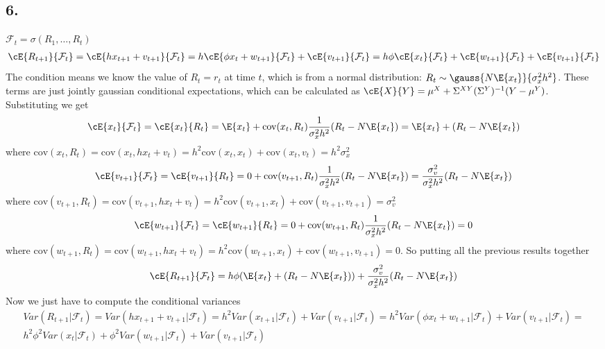 \subsection*{6.} 
$\mathcal{F}_t = \sigma(R_1,\ldots,R_t )$
\begin{gather*}
\cE{R_{t+1}}{\mathcal{F}_t} = \cE{hx_{t+1}+v_{t+1}}{\mathcal{F}_t} = h \cE{\phi x_t + w_{t+1}}{\mathcal{F}_t} + \cE{v_{t+1}}{\mathcal{F}_t} =
h \phi \cE{x_t}{\mathcal{F}_t} + \cE{w_{t+1}}{\mathcal{F}_t} + \cE{v_{t+1}}{\mathcal{F}_t} 
\end{gather*}
The condition means we know the value of $R_t=r_t$ at time $t$, which is from a normal distribution: $R_t \sim \gauss{N\E{x_t}}{\sigma^2_xh^2}$. These terms are just jointly gaussian conditional expectations, which can be calculated as $\cE{X}{Y}= \mu^{X}+\Sigma^{XY}(\Sigma^{Y})^{-1}(Y-\mu^{Y})$. Substituting we get
\begin{gather*}
    \cE{x_t}{\mathcal{F}_t}=\cE{x_t}{R_t}=\E{x_t}+\text{cov}(x_t,R_t)\frac{1}{\sigma_x^2h^2}(R_t-N \E{x_t}) = \E{x_t}+(R_t-N \E{x_t})
\end{gather*}
where $\text{cov}(x_t,R_t)=\text{cov}(x_t,hx_t+v_t)=h^2 \text{cov}(x_t,x_t)+\text{cov}(x_t,v_t)=h^2\sigma_x^2$
\begin{gather*}
    \cE{v_{t+1}}{\mathcal{F}_t}=\cE{v_{t+1}}{R_t} = 0 + \text{cov}(v_{t+1},R_t) \frac{1}{\sigma_x^2h^2}(R_t-N\E{x_t})=\frac{\sigma_v^2}{\sigma_x^2h^2}(R_t-N\E{x_t})
\end{gather*}
where $\text{cov}(v_{t+1},R_t)=\text{cov}(v_{t+1},hx_t+v_t)=h^2 \text{cov}(v_{t+1},x_t)+\text{cov}(v_{t+1},v_{t+1})=\sigma_v^2$
\begin{gather*}
    \cE{w_{t+1}}{\mathcal{F}_t}=\cE{w_{t+1}}{R_t} = 0 + \text{cov}(w_{t+1},R_t) \frac{1}{\sigma_x^2h^2}(R_t-N\E{x_t}) = 0
\end{gather*}
where $\text{cov}(w_{t+1},R_t)=\text{cov}(w_{t+1},hx_t+v_t)=h^2 \text{cov}(w_{t+1},x_t)+\text{cov}(w_{t+1},v_{t+1})= 0$.
So putting all the previous results together
\begin{gather*}
    \cE{R_{t+1}}{\mathcal{F}_t} = h\phi (\E{x_t} + (R_t-N \E{x_t})) + \frac{\sigma_v^2}{\sigma_x^2h^2}(R_t-N\E{x_t})
\end{gather*}
Now we just have to compute the conditional variances
\begin{gather*}
 Var(R_{t+1}|\mathcal{F}_t) = Var(hx_{t+1}+v_{t+1}|\mathcal{F}_t)=h^2 Var(x_{t+1}| \mathcal{F}_t)+Var(v_{t+1}|\mathcal{F}_t)= h^2 Var(\phi x_t + w_{t+1}| \mathcal{F}_t)+Var(v_{t+1}|\mathcal{F}_t) = \\ 
 h^2 \phi^2 Var( x_t| \mathcal{F}_t)+\phi^2 Var(w_{t+1}|\mathcal{F}_t)+Var(v_{t+1}|\mathcal{F}_t)
\end{gather*}
